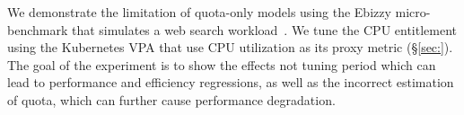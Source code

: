We demonstrate the limitation of quota-only models using the Ebizzy micro-benchmark that simulates a web search workload~\cite{henson_ebizzy_2008}. 
We tune the CPU entitlement using the Kubernetes VPA that use CPU utilization as its proxy metric (\S\ref{sec:}).
The goal of the experiment is to show the effects not tuning period which can lead to performance and efficiency regressions, as well as the incorrect estimation of quota, which can further cause performance degradation.

\begin{table*}[]
\caption{Vertical CPU autoscaling techniques comparison}\label{VPA-table}
\label{tab:my-table}
\end{table*}

